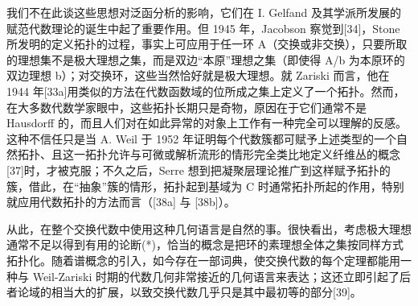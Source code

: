 我们不在此谈这些思想对泛函分析的影响，它们在 I. Gelfand 及其学派所发展的赋范代数理论的诞生中起了重要作用。但 1945 年，Jacobson 察觉到{[}34{]}，Stone 所发明的定义拓扑的过程，事实上可应用于任一环 A（交换或非交换），只要所取的理想集不是极大理想之集，而是双边“本原”理想之集（即使得 A/b 为本原环的双边理想 b）；对交换环，这些当然恰好就是极大理想。就 Zariski 而言，他在 1944 年{[}33a{]}用类似的方法在代数函数域的位所成之集上定义了一个拓扑。然而，在大多数代数学家眼中，这些拓扑长期只是奇物，原因在于它们通常不是 Hausdorff 的，而且人们对在如此异常的对象上工作有一种完全可以理解的反感。这种不信任只是当 A. Weil 于 1952 年证明每个代数簇都可赋予上述类型的一个自然拓扑、且这一拓扑允许与可微或解析流形的情形完全类比地定义纤维丛的概念{[}37{]}时，才被克服；不久之后，Serre 想到把凝聚层理论推广到这样赋予拓扑的簇，借此，在“抽象”簇的情形，拓扑起到基域为 C 时通常拓扑所起的作用，特别就应用代数拓扑的方法而言（{[}38a{]} 与 {[}38b{]}）。

从此，在整个交换代数中使用这种几何语言是自然的事。很快看出，考虑极大理想通常不足以得到有用的论断(*)，恰当的概念是把环的素理想全体之集按同样方式拓扑化。随着谱概念的引入，如今存在一部词典，使交换代数的每个定理都能用一种与 Weil-Zariski 时期的代数几何非常接近的几何语言来表达；这还立即引起了后者论域的相当大的扩展，以致交换代数几乎只是其中最初等的部分{[}39{]}。
